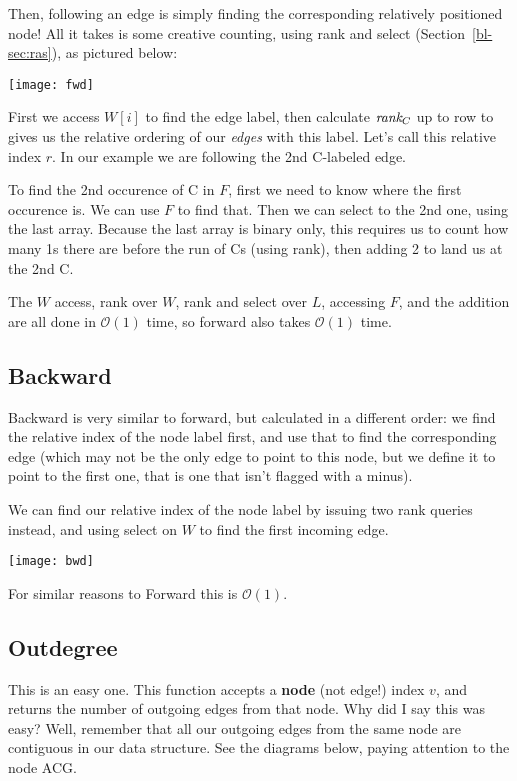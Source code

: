 Then, following an edge is simply finding the corresponding relatively positioned node! All it takes is some creative counting, using rank and select (Section~\ref{bl-sec:ras}), as pictured below:

\medskip\centerline{\texttt{[image: fwd]}}\medskip

First we access $W[i]$ to find the edge label, then calculate $\textit{rank}_C$ up to row to gives us the relative ordering of our \emph{edges} with this label. Let's call this relative index $r$. In our example we are following the 2nd C-labeled edge.

To find the 2nd occurence of C in $F$, first we need to know where the first occurence is. We can use $F$ to find that. Then we can select to the 2nd one, using the last array. Because the last array is binary only, this requires us to count how many 1s there are before the run of Cs (using rank), then adding 2 to land us at the 2nd C.

The $W$ access, rank over $W$, rank and select over $L$, accessing $F$, and the addition are all done in $\mathcal{O}(1)$ time, so forward also takes $\mathcal{O}(1)$ time.

\subsection{Backward}\label{bl-sec:bwd}

Backward is very similar to forward, but calculated in a different order: we find the relative index of the node label first, and use that to find the corresponding edge (which may not be the only edge to point to this node, but we define it to point to the first one, that is one that isn't flagged with a minus).

We can find our relative index of the node label by issuing two rank queries instead, and using select on $W$ to find the first incoming edge.

\medskip\centerline{\texttt{[image: bwd]}}\medskip

For similar reasons to Forward this is $\mathcal{O}(1)$.

\subsection{Outdegree}\label{bl-sec:out}

This is an easy one. This function accepts a {\bf node} (not edge!) index $v$, and returns the number of outgoing edges from that node. Why did I say this was easy? Well, remember that all our outgoing edges from the same node are contiguous in our data structure. See the diagrams below, paying attention to the node ACG.

